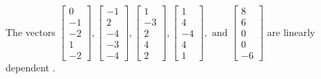 \begin{exercise}
\begin{exerciseStatement}
  \end{exerciseStatement}
  \begin{exerciseAnswer}
   The vectors \(\left[\begin{array}{r}
0 \\
-1 \\
-2 \\
1 \\
-2
\end{array}\right] , \left[\begin{array}{r}
-1 \\
2 \\
-4 \\
-3 \\
-4
\end{array}\right] , \left[\begin{array}{r}
1 \\
-3 \\
2 \\
4 \\
2
\end{array}\right] , \left[\begin{array}{r}
1 \\
4 \\
-4 \\
4 \\
1
\end{array}\right] , \text{ and } \left[\begin{array}{r}
8 \\
6 \\
0 \\
0 \\
-6
\end{array}\right]\) are 
  	 linearly dependent  .
  


  \end{exerciseAnswer}
\end{exercise}